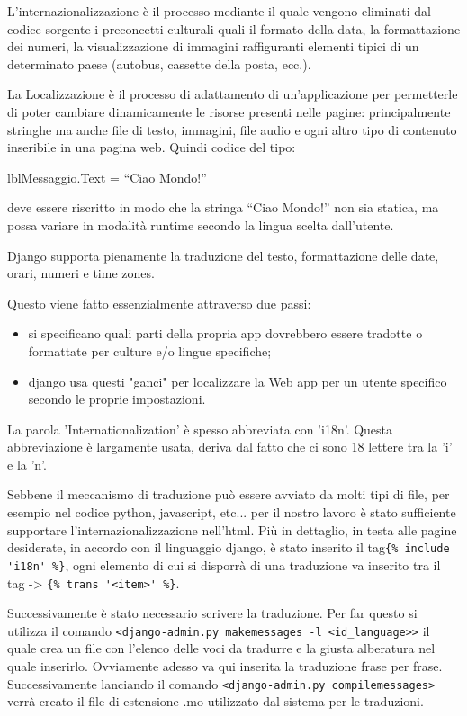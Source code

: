 L'internazionalizzazione è il processo mediante il quale vengono eliminati dal codice sorgente i preconcetti culturali quali il formato della data, la formattazione dei numeri, la visualizzazione di immagini raffiguranti elementi tipici di un determinato paese (autobus, cassette della posta, ecc.). 

La Localizzazione è il processo di adattamento di un’applicazione per permetterle di poter cambiare dinamicamente le risorse presenti nelle pagine: principalmente stringhe ma anche file di testo, immagini, file audio e ogni altro tipo di contenuto inseribile in una pagina web.
Quindi codice del tipo:

lblMessaggio.Text = “Ciao Mondo!”

deve essere riscritto in modo che la stringa “Ciao Mondo!” non sia statica, ma possa variare in modalità runtime secondo la lingua scelta dall’utente.

Django supporta pienamente la traduzione del testo, formattazione delle date, orari, numeri e  time zones.

Questo viene fatto essenzialmente attraverso due passi:
\begin{itemize}
	\item si specificano quali parti della propria app dovrebbero essere tradotte o formattate per culture e/o lingue specifiche;
	\item django usa questi "ganci" per localizzare la Web app per un utente specifico secondo le proprie impostazioni.
\end{itemize}

La parola 'Internationalization' è spesso abbreviata con 'i18n'. Questa abbreviazione è largamente usata, deriva dal fatto che ci sono 18 lettere tra la 'i' e la 'n'.

Sebbene il meccanismo di traduzione può essere avviato da molti tipi di file, per esempio nel codice python, javascript, etc... per il nostro lavoro è stato sufficiente supportare l'internazionalizzazione nell'html. Più in dettaglio, in testa alle pagine desiderate, in accordo con il linguaggio django, è stato inserito  il tag\lstinline${% include 'i18n' %}$, ogni elemento di cui si disporrà di una traduzione va inserito tra il tag -> \lstinline${% trans '<item>' %}$.

Successivamente è stato necessario scrivere la traduzione. Per far questo si utilizza il comando
\lstinline$<django-admin.py makemessages -l <id_language>>$
il quale crea un file con l'elenco delle voci da tradurre e la giusta alberatura  nel quale inserirlo. Ovviamente adesso va qui inserita la traduzione frase per frase. Successivamente lanciando il comando 
\lstinline$<django-admin.py compilemessages>$
verrà creato il file di estensione .mo utilizzato dal sistema per le traduzioni.

\endinput
